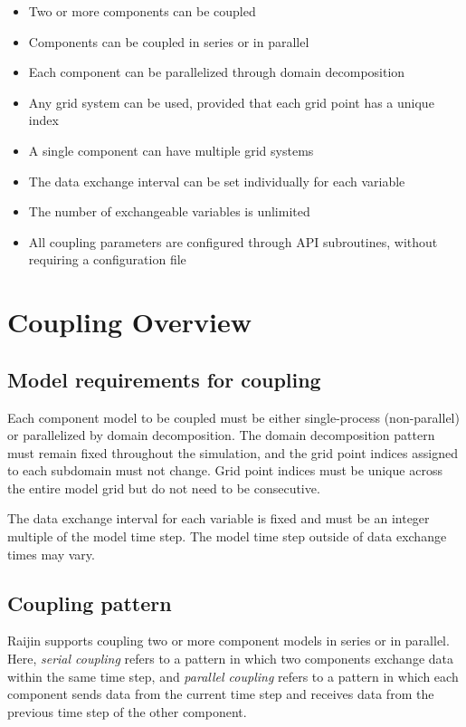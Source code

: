 \documentclass[11pt,a4paper]{report}
\begin{document}
\begin{itemize}
\item Two or more components can be coupled
\item Components can be coupled in series or in parallel
\item Each component can be parallelized through domain decomposition
\item Any grid system can be used, provided that
      each grid point has a unique index
\item A single component can have multiple grid systems
\item The data exchange interval can be set individually for each variable
\item The number of exchangeable variables is unlimited
\item All coupling parameters are configured through API subroutines,
      without requiring a configuration file
\end{itemize}

\section{Coupling Overview}

\subsection{Model requirements for coupling}

Each component model to be coupled must be either single-process (non-parallel)
or parallelized by domain decomposition.
The domain decomposition pattern must remain fixed throughout the simulation,
and the grid point indices assigned to each subdomain must not change.
Grid point indices must be unique across the entire model grid
but do not need to be consecutive.

The data exchange interval for each variable is fixed
and must be an integer multiple of the model time step.
The model time step outside of data exchange times may vary.

\subsection{Coupling pattern}

Raijin supports coupling two or more component models
in series or in parallel.
Here, \emph{serial coupling} refers to a pattern
in which two components exchange data within the same time step,
and \emph{parallel coupling} refers to a pattern
in which each component sends data from the current time step
and receives data from the previous time step of the other component.
\end{document}
